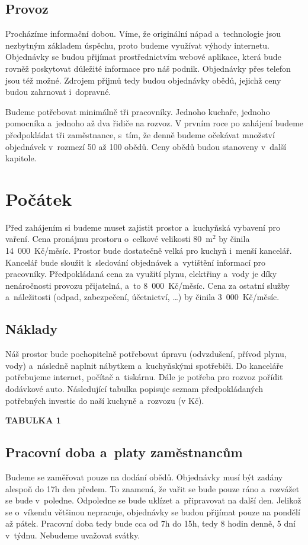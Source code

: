 \subsection{Provoz}
Procházíme informační dobou. Víme, že originální nápad a~technologie jsou nezbytným základem úspěchu, proto budeme využívat výhody internetu. Objednávky se budou přijímat prostřednictvím webové aplikace, která bude rovněž poskytovat důležité informace pro náš podnik. Objednávky přes telefon jsou též možné. Zdrojem příjmů tedy budou objednávky obědů, jejichž ceny budou zahrnovat i~dopravné.

Budeme potřebovat minimálně tři pracovníky. Jednoho kuchaře, jednoho pomocníka a~jednoho až dva řidiče na rozvoz. V prvním roce po zahájení budeme předpokládat tři zaměstnance, s~tím, že denně budeme očekávat množství objednávek v~rozmezí 50 až 100 obědů. Ceny obědů budou stanoveny v~další kapitole.





\section{Počátek}
Před zahájením si budeme muset zajistit prostor a~kuchyňská vybavení pro vaření. Cena pronájmu prostoru o~celkové velikosti 80~m$^2$ by činila 14~000~Kč/měsíc. Prostor bude dostatečně velká pro kuchyň i~menší kancelář. Kancelář bude sloužit k~sledování objednávek a~vytištění informací pro pracovníky. Předpokládaná cena za využití plynu, elektřiny a~vody je díky nenáročnosti provozu přijatelná, a~to 8~000~Kč/měsíc. Cena za ostatní služby a~náležitosti (odpad, zabezpečení, účetnictví, \ldots) by činila 3~000~Kč/měsíc.

\subsection{Náklady}
Náš prostor bude pochopitelně potřebovat úpravu (odvzdušení, přívod plynu, vody) a~ná\-sledně naplnit nábytkem a~kuchyňskými spotřebiči. Do kanceláře potřebujeme internet, počítač a~tiskárnu. Dále je potřeba pro rozvoz pořídit dodávkové auto. Následující tabulka popisuje seznam předpokládaných potřebných investic do naší kuchyně a~rozvozu (v Kč).

\textbf{TABULKA 1}

\subsection{Pracovní doba a~platy zaměstnancům}
Budeme se zaměřovat pouze na dodání obědů. Objednávky musí být zadány alespoň do 17h den předem. To znamená, že vařit se bude pouze ráno a~rozvážet se bude v~poledne. Odpoledne se bude uklízet a~připravovat na další den. Jelikož se o~víkendu většinou nepracuje, objednávky se budou přijímat pouze na pondělí až pátek. Pracovní doba tedy bude cca od 7h do 15h, tedy 8 hodin denně, 5 dní v~týdnu. Nebudeme uvažovat svátky.

